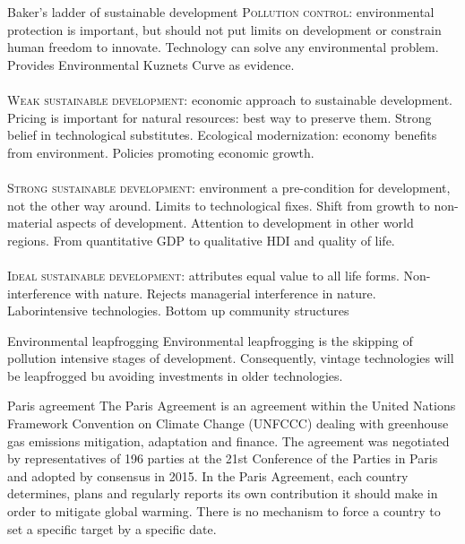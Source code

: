 \begin{sortEnvironment}{Baker's ladder of sustainable development}
\textsc{Pollution control:} environmental protection is important, but should not put limits on development or constrain human freedom to innovate. Technology can solve any environmental problem. Provides Environmental Kuznets Curve as evidence.\\
\\
\textsc{Weak sustainable development:} economic approach to sustainable development. Pricing is important for natural resources: best way to preserve them. Strong belief in technological substitutes. Ecological modernization: economy benefits from environment. Policies promoting economic growth. \\
\\
\textsc{Strong sustainable development:} environment a pre-condition for development, not the other way around. Limits to technological fixes. Shift from growth to non-material aspects of development. Attention to development in other world regions. From quantitative GDP to qualitative HDI and quality of life. \\
\\
\textsc{Ideal sustainable development:} attributes equal value to all life forms. Non-interference with nature. Rejects managerial interference in nature. Laborintensive technologies. Bottom up community structures 
\end{sortEnvironment}

\begin{sortEnvironment}{Environmental leapfrogging}
Environmental leapfrogging is the skipping of pollution intensive stages of development. Consequently, vintage technologies will be leapfrogged bu avoiding investments in older technologies.
\end{sortEnvironment}

\begin{sortEnvironment}{Paris agreement}
The Paris Agreement is an agreement within the United Nations Framework Convention on Climate Change (UNFCCC) dealing with greenhouse gas emissions mitigation, adaptation and finance. The agreement was negotiated by representatives of 196 parties at the 21st Conference of the Parties in Paris and adopted by consensus in 2015. In the Paris Agreement, each country determines, plans and regularly reports its own contribution it should make in order to mitigate global warming. There is no mechanism to force a country to set a specific target by a specific date.
\end{sortEnvironment}

